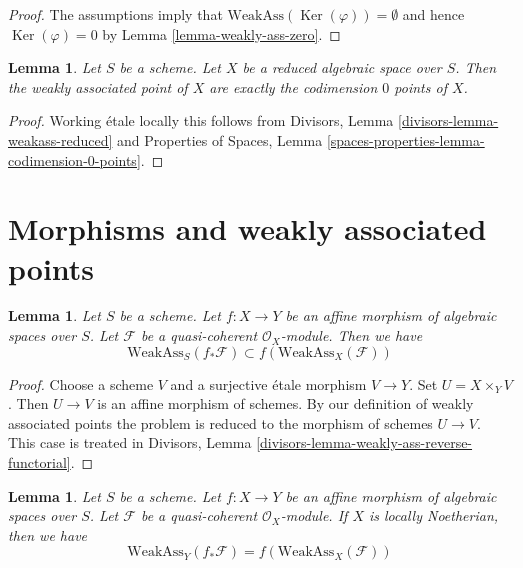 \documentclass{stacks-project}
\theoremstyle{plain}
\newtheorem{lemma}[subsection]{Lemma}
\theoremstyle{definition}
\theoremstyle{remark}
\numberwithin{equation}{subsection}
\def\Ker{\mathop{\mathrm{Ker}}}
\begin{document}
\begin{proof}
The assumptions imply that $\text{WeakAss}(\Ker(\varphi)) = \emptyset$
and hence $\Ker(\varphi) = 0$ by Lemma \ref{lemma-weakly-ass-zero}.
\end{proof}

\begin{lemma}
\label{lemma-weakass-reduced}
Let $S$ be a scheme. Let $X$ be a reduced algebraic space over $S$.
Then the weakly associated point of $X$ are exactly the codimension $0$
points of $X$.
\end{lemma}

\begin{proof}
Working \'etale locally this follows from
Divisors, Lemma \ref{divisors-lemma-weakass-reduced}
and
Properties of Spaces, Lemma \ref{spaces-properties-lemma-codimension-0-points}.
\end{proof}










\section{Morphisms and weakly associated points}
\label{section-morphisms-weakly-associated}

\begin{lemma}
\label{lemma-weakly-ass-reverse-functorial}
Let $S$ be a scheme.
Let $f : X \to Y$ be an affine morphism of algebraic spaces over $S$.
Let $\mathcal{F}$ be a quasi-coherent $\mathcal{O}_X$-module.
Then we have
$$
\text{WeakAss}_S(f_*\mathcal{F}) \subset f(\text{WeakAss}_X(\mathcal{F}))
$$
\end{lemma}

\begin{proof}
Choose a scheme $V$ and a surjective \'etale morphism $V \to Y$.
Set $U = X \times_Y V$. Then $U \to V$ is an affine morphism
of schemes. By our definition of weakly associated points
the problem is reduced to the morphism of schemes $U \to V$. This case is
treated in Divisors, Lemma \ref{divisors-lemma-weakly-ass-reverse-functorial}.
\end{proof}

\begin{lemma}
\label{lemma-ass-functorial-equal}
Let $S$ be a scheme.
Let $f : X \to Y$ be an affine morphism of algebraic spaces over $S$.
Let $\mathcal{F}$ be a quasi-coherent $\mathcal{O}_X$-module.
If $X$ is locally Noetherian, then we have
$$
\text{WeakAss}_Y(f_*\mathcal{F}) =
f(\text{WeakAss}_X(\mathcal{F}))
$$
\end{lemma}
\end{document}
